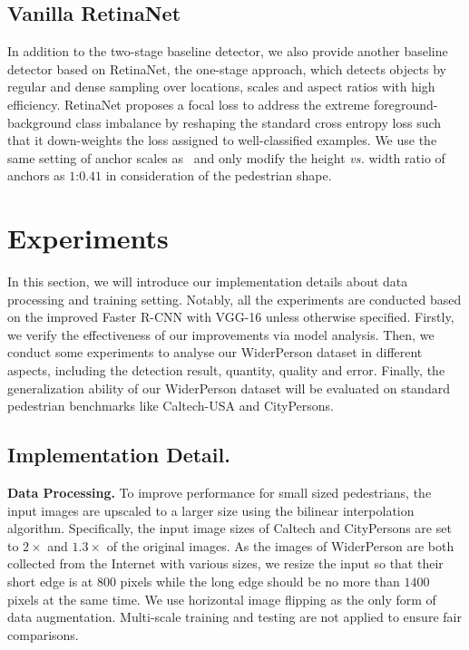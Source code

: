 \documentclass[journal]{IEEEtran}
\begin{document}
\subsection{Vanilla RetinaNet}
In addition to the two-stage baseline detector, we also provide another baseline detector based on RetinaNet, the one-stage approach, which detects objects by regular and dense sampling over locations, scales and aspect ratios with high efficiency. RetinaNet proposes a focal loss to address the extreme foreground-background class imbalance by reshaping the standard cross entropy loss such that it down-weights the loss assigned to well-classified examples. We use the same setting of anchor scales as~\cite{DBLP:conf/iccv/LinPRK17} and only modify the height \emph{vs.} width ratio of anchors as $1$:$0.41$ in consideration of the pedestrian shape.

\section{Experiments} \label{5}
In this section, we will introduce our implementation details about data processing and training setting. Notably, all the experiments are conducted based on the improved Faster R-CNN with VGG-16 unless otherwise specified. Firstly, we verify the effectiveness of our improvements via model analysis. Then, we conduct some experiments to analyse our WiderPerson dataset in different aspects, including the detection result, quantity, quality and error. Finally, the generalization ability of our WiderPerson dataset will be evaluated on standard pedestrian benchmarks like Caltech-USA and CityPersons.


\subsection{Implementation Detail.}
{\flushleft \textbf{Data Processing. }}
To improve performance for small sized pedestrians, the input images are upscaled to a larger size using the bilinear interpolation algorithm. Specifically, the input image sizes of Caltech and CityPersons are set to $2\times$ and $1.3\times$ of the original images. As the images of WiderPerson are both collected from the Internet with various sizes, we resize the input so that their short edge is at $800$ pixels while the long edge should be no more than $1400$ pixels at the same time. We use horizontal image flipping as the only form of data augmentation. Multi-scale training and testing are not applied to ensure fair comparisons.
\end{document}
